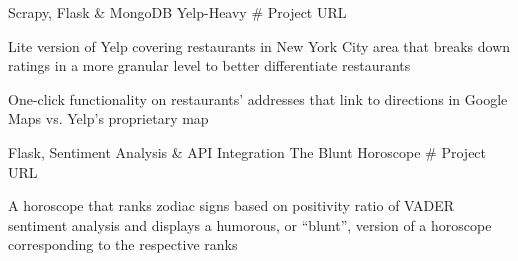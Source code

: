 

\begin{cventries}

 \cventry
    {Scrapy, Flask \& MongoDB} %
    {Yelp-Heavy} %
    {\# Project URL} %
    {} %
    {
      \begin{cvitems} %
        \item {Lite version of Yelp covering restaurants in New York City area that breaks down ratings in a more granular level to better differentiate restaurants}
        \item {One-click functionality on restaurants’ addresses that link to directions in Google Maps vs. Yelp’s proprietary map}
      \end{cvitems}
    }

 \cventry
    {Flask, Sentiment Analysis \& API Integration} %
    {The Blunt Horoscope} %
    {\# Project URL} %
    {} %
    {
      \begin{cvitems} %
        \item {A horoscope that ranks zodiac signs based on positivity ratio of VADER sentiment analysis and displays a humorous, or “blunt”, version of a horoscope corresponding to the respective ranks}
      \end{cvitems}
    }

\end{cventries}